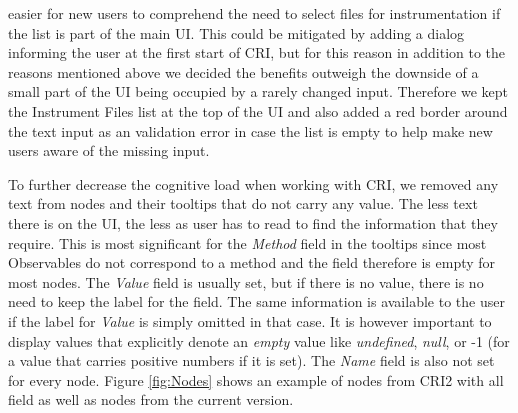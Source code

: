 easier for new users to comprehend the need to select files for instrumentation if the list is part of the main UI. This could be mitigated by adding a dialog informing the user at the first start of CRI, but for this reason in addition to the reasons mentioned above we decided the benefits outweigh the downside of a small part of the UI being occupied by a rarely changed input. Therefore we kept the Instrument Files list at the top of the UI and also added a red border around the text input as an validation error in case the list is empty to help make new users aware of the missing input.

To further decrease the cognitive load when working with CRI, we removed any text from nodes and their tooltips that do not carry any value. The less text there is on the UI, the less as user has to read to find the information that they require. This is most significant for the \emph{Method} field in the tooltips since most Observables do not correspond to a method and the field therefore is empty for most nodes. The \emph{Value} field is usually set, but if there is no value, there is no need to keep the label for the field. The same information is available to the user if the label for \emph{Value} is simply omitted in that case.
It is however important to display values that explicitly denote an \emph{empty} value like \emph{undefined}, \emph{null}, or -1 (for a value that carries positive numbers if it is set). The \emph{Name} field is also not set for every node. Figure \ref{fig:Nodes} shows an example of nodes from CRI2 with all field as well as nodes from the current version.

